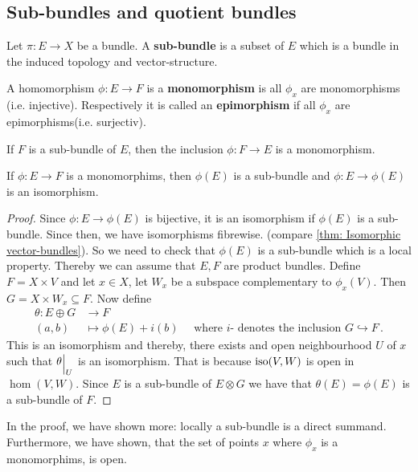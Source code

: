 \subsection{Sub-bundles and quotient bundles}
\begin{definition}\label{def: Sub-bundles}
	Let $\pi:E\to X$ be a bundle. A \textbf{sub-bundle} is a subset of $E$ which is a bundle in the induced topology and vector-structure.     
\end{definition}
\begin{definition}\label{def: Mono- and epimorphism}
	A homomorphism $\phi: E\to F$ is a \textbf{monomorphism} is all $\phi_x$ are monomorphisms (i.e. injective). Respectively it is called an \textbf{epimorphism} if all $\phi_x$ are epimorphisms(i.e. surjectiv).
\end{definition}
\begin{corollary}
	If $F$ is a sub-bundle of $E$, then the inclusion $\phi:F\to E$ is a monomorphism.
\end{corollary}
\newpage
\begin{lemma} \label{lem: monos induce sub-bundles}
	If $\phi:E \to F$ is a monomorphims, then $\phi(E)$ is a sub-bundle and $\phi:E\to \phi(E)$ is an isomorphism. 
\end{lemma}
\begin{proof}
	Since $\phi:E\to \phi(E)$ is bijective, it is an isomorphism if $\phi(E)$ is a sub-bundle. Since then, we have isomorphisms fibrewise. (compare \ref{thm: Isomorphic vector-bundles}). So we need to check that $\phi(E)$ is a sub-bundle which is a local property. Thereby we can assume that $E,F$ are product bundles. Define  $F=X\times V$ and let $x\in X$, let $W_x$ be a subspace complementary to $\phi_x(V)$. Then $G=X\times W_x\subseteq F$. Now define
	\begin{align*}
		\theta:E\oplus G &\to F\\
		(a,b)&\mapsto \phi(E)+i(b)\quad \text{ where $i$- denotes the inclusion }G\hookrightarrow F \, .
	\end{align*} This is an isomorphism and thereby, there exists and open neighbourhood $U$ of $x$ such that ${\theta}\einsch{U}$ is an isomorphism.  That is because $\mathrm{iso}(V,W)$ is open in $\hom(V,W)$. Since $E$ is a sub-bundle of $E\otimes G$ we have that $\theta(E)=\phi(E)$ is a sub-bundle of $F$. 
\end{proof}
\begin{corollary}
	In the proof, we have shown more: locally a sub-bundle is a direct summand. Furthermore, we have shown, that the set of points $x$ where $\phi_x$ is a monomorphims, is open.
\end{corollary}
